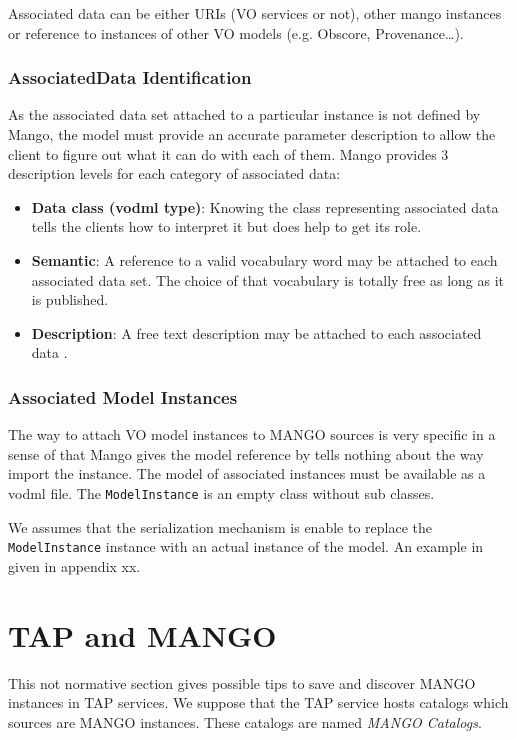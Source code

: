\documentclass[11pt,a4paper]{ivoa}
\begin{document}
Associated data can be either URIs (VO services or not), other mango instances or reference to instances of other VO models (e.g. Obscore, Provenance…).

\subsubsection{AssociatedData Identification}
As the associated data set  attached to a particular instance is not defined by Mango, the model must provide an accurate parameter description to allow the client to figure out what it can do with each of them.
Mango provides 3 description levels for each category of associated data:

\begin{itemize}
    \item \textbf{Data class (vodml type)}: Knowing the class representing associated data tells the clients  how to interpret it but does help to get its role.
    \item \textbf{Semantic}: A reference to  a valid vocabulary word may be attached to each associated data set. The choice of that vocabulary is totally free as long as it is published.
    \item \textbf{Description}: A free text description may be attached to each associated data .
 \end{itemize}

\subsubsection{Associated Model Instances}
The way to attach VO model instances to MANGO sources is very specific in a sense of that Mango gives the model reference by tells nothing about the way import  the instance.
The model of associated instances must be available as a vodml file.
The \texttt{ModelInstance} is an empty class without sub classes.

We assumes  that the serialization mechanism is enable to replace the \texttt{ModelInstance} instance with an actual instance of the model. An example in given in appendix xx.






\section{TAP and MANGO}
This not normative section gives possible tips to save and discover MANGO instances in TAP services.
We suppose that the TAP service hosts catalogs which sources are MANGO instances. These catalogs are named \emph{MANGO Catalogs}.
\end{document}
